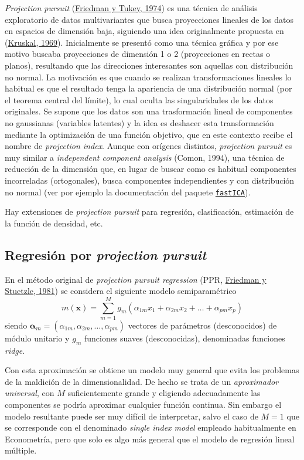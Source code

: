 \documentclass[
]{book}
\theoremstyle{break}
\theoremstyle{nonumberplain}
\begin{document}
\emph{Projection pursuit} (\protect\hyperlink{ref-friedman1974projection}{Friedman y Tukey, 1974}) es una técnica de análisis exploratorio de datos multivariantes que busca proyecciones lineales de los datos en espacios de dimensión baja, siguiendo una idea originalmente propuesta en (\protect\hyperlink{ref-kruskal1969toward}{Kruskal, 1969}).
Inicialmente se presentó como una técnica gráfica y por ese motivo buscaba proyecciones de dimensión 1 o 2 (proyecciones en rectas o planos), resultando que las direcciones interesantes son aquellas con distribución no normal.
La motivación es que cuando se realizan transformaciones lineales lo habitual es que el resultado tenga la apariencia de una distribución normal (por el teorema central del límite), lo cual oculta las singularidades de los datos originales.
Se supone que los datos son una trasformación lineal de componentes no gaussianas (variables latentes) y la idea es deshacer esta transformación mediante la optimización de una función objetivo, que en este contexto recibe el nombre de \emph{projection index}.
Aunque con orígenes distintos, \emph{projection pursuit} es muy similar a \emph{independent component analysis} (Comon, 1994), una técnica de reducción de la dimensión que, en lugar de buscar como es habitual componentes incorreladas (ortogonales), busca componentes independientes y con distribución no normal (ver por ejemplo la documentación del paquete \href{NA}{\texttt{fastICA}}).

Hay extensiones de \emph{projection pursuit} para regresión, clasificación, estimación de la función de densidad, etc.

\hypertarget{ppr}{%
\subsection{\texorpdfstring{Regresión por \emph{projection pursuit}}{Regresión por projection pursuit}}\label{ppr}}

En el método original de \emph{projection pursuit regression} (PPR, \protect\hyperlink{ref-friedman1981projection}{Friedman y Stuetzle, 1981}) se considera el siguiente modelo semiparamétrico
\[m(\mathbf{x}) = \sum_{m=1}^M g_m (\alpha_{1m}x_1 + \alpha_{2m}x_2 + \ldots + \alpha_{pm}x_p)\]
siendo \(\boldsymbol{\alpha}_m = (\alpha_{1m}, \alpha_{2m}, \ldots, \alpha_{pm})\) vectores de parámetros (desconocidos) de módulo unitario y \(g_m\) funciones suaves (desconocidas), denominadas funciones \emph{ridge}.

Con esta aproximación se obtiene un modelo muy general que evita los problemas de la maldición de la dimensionalidad.
De hecho se trata de un \emph{aproximador universal}, con \(M\) suficientemente grande y eligiendo adecuadamente las componentes se podría aproximar cualquier función continua.
Sin embargo el modelo resultante puede ser muy difícil de interpretar, salvo el caso de \(M=1\) que se corresponde con el denominado \emph{single index model} empleado habitualmente en Econometría, pero que solo es algo más general que el modelo de regresión lineal múltiple.
\end{document}
